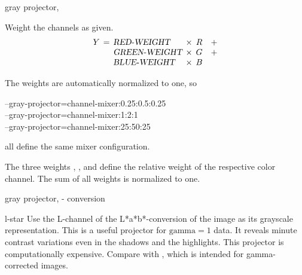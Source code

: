 \begin{codelist}
\begin{codelist}
           {gray projector, }%
  \item[\itempar{channel-mixer:\metavar{RED-WEIGHT}:\feasiblebreak
    \metavar{GREEN-WEIGHT}:\feasiblebreak\metavar{BLUE-WEIGHT}}]\itemend
    Weight the channels as given.
    \[
    \begin{array}{r@{\hspace{1ex}}c@{\hspace{1ex}}l@{\hspace{1ex}}c@{\hspace{1ex}}cc}
      Y & = & \metavar{RED-WEIGHT}   & \times & R & + \\
        &   & \metavar{GREEN-WEIGHT} & \times & G & + \\
        &   & \metavar{BLUE-WEIGHT}  & \times & B &
    \end{array}
    \]

    The weights are automatically normalized to one, so

    \begin{literal}
      --gray-projector=channel-mixer:0.25:0.5:0.25 \\
      --gray-projector=channel-mixer:1:2:1 \\
      --gray-projector=channel-mixer:25:50:25
    \end{literal}

    all define the same mixer configuration.

    The three weights , , and
     define the relative weight of the respective color channel.  The
    sum of all weights is normalized to one.

           {gray projector, }%
           {- conversion}%
  \item[l-star]\itemend
    Use the L-channel of the L*a*b*-conversion of the image as its grayscale representation.
    This is a useful projector for $\mbox{gamma} = 1$ data.  It reveals minute contrast
    variations even in the shadows and the highlights.  This projector is computationally
    expensive.  Compare with , which is intended for gamma-corrected images.


\end{codelist}
\end{codelist}
